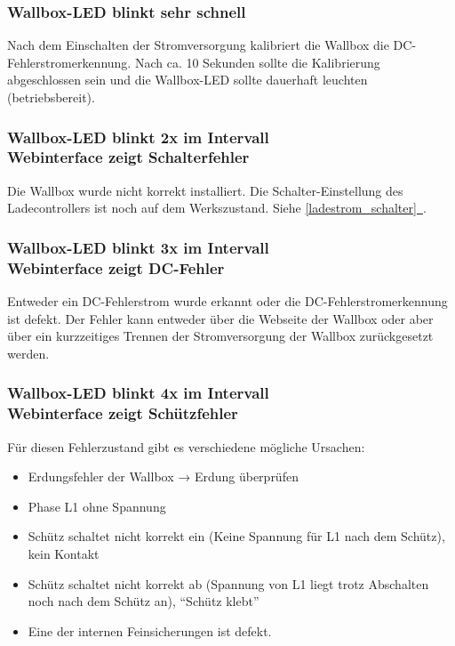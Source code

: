 \documentclass[a4paper,10pt]{article}
\newcommand*{\fullref}[1]{\hyperref[{#1}]{\ref*{#1}~\nameref*{#1}}}
\begin{document}
\begin{multicols*}{2}
	\subsubsection*{Wallbox-LED blinkt sehr schnell}
	Nach dem Einschalten der Stromversorgung kalibriert die Wallbox die
	DC-Fehlerstromerkennung. Nach ca. 10 Sekunden sollte die Kalibrierung
	abgeschlossen sein und die Wallbox-LED sollte dauerhaft leuchten
	(betriebsbereit).

	\subsubsection*{Wallbox-LED blinkt 2x im Intervall \\ Webinterface zeigt Schalterfehler}
	Die Wallbox wurde nicht korrekt installiert. Die Schalter-Einstellung des Ladecontrollers ist
	noch auf dem Werkszustand. Siehe \fullref{ladestrom_schalter}.

	\begin{minipage}{\linewidth} %
		\subsubsection*{Wallbox-LED blinkt 3x im Intervall \\ Webinterface zeigt DC-Fehler}
		Entweder ein DC-Fehlerstrom wurde erkannt oder die DC-Fehlerstromerkennung ist defekt.
		Der Fehler kann entweder über die Webseite der Wallbox oder aber über
		ein kurzzeitiges Trennen der Stromversorgung der Wallbox zurückgesetzt
		werden.
	\end{minipage}

	\subsubsection*{Wallbox-LED blinkt 4x im Intervall \\ Webinterface zeigt Schützfehler}
	Für diesen Fehlerzustand gibt es verschiedene mögliche Ursachen:
	\begin{itemize}
		\item Erdungsfehler der Wallbox → Erdung überprüfen
		\item Phase L1 ohne Spannung
		\item Schütz schaltet nicht korrekt ein (Keine Spannung für L1 nach dem Schütz), kein
		      Kontakt
		\item Schütz schaltet nicht korrekt ab (Spannung von L1 liegt trotz Abschalten noch
		      nach dem Schütz an), \enquote{Schütz klebt}
		\item Eine der internen Feinsicherungen ist defekt.
	\end{itemize}


\end{multicols*}
\end{document}
